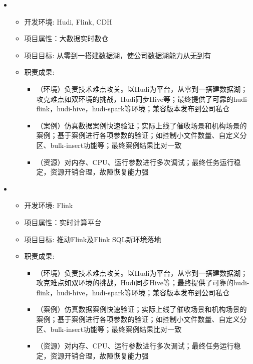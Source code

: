   \begin{itemize}[leftmargin=*]
    \item
      {\small
      \begin{itemize}
        \item 开发环境: Hudi, Flink, CDH
        \item 项目属性：大数据实时数仓
        \item 项目目标: 从零到一搭建数据湖，使公司数据湖能力从无到有
        \item 职责成果: 
        \begin{itemize}
          \item （环境）负责技术难点攻关。以Hudi为平台，从零到一搭建数据湖；攻克难点如双环境的挑战，Hudi同步Hive等；最终提供了可靠的hudi-flink，hudi-hive，hudi-spark等环境；兼容版本发布到公司私仓
          \item （案例）仿真数据案例快速验证；实际上线了催收场景和机构场景的案例；基于案例进行各项参数的验证；如控制小文件数量、自定义分区、bulk-insert功能等；最终案例结果比对一致
          \item （资源）对内存、CPU、运行参数进行多次调试；最终任务运行稳定，资源开销合理，故障恢复能力强
        \end{itemize}
      \end{itemize}
      }
  \end{itemize}

  \begin{itemize}[leftmargin=*]
    \item
      {\small
      \begin{itemize}
        \item 开发环境: Flink
        \item 项目属性：实时计算平台
        \item 项目目标: 推动Flink及Flink SQL新环境落地
        \item 职责成果: 
        \begin{itemize}
          \item （环境）负责技术难点攻关。以Hudi为平台，从零到一搭建数据湖；攻克难点如双环境的挑战，Hudi同步Hive等；最终提供了可靠的hudi-flink，hudi-hive，hudi-spark等环境；兼容版本发布到公司私仓
          \item （案例）仿真数据案例快速验证；实际上线了催收场景和机构场景的案例；基于案例进行各项参数的验证；如控制小文件数量、自定义分区、bulk-insert功能等；最终案例结果比对一致
          \item （资源）对内存、CPU、运行参数进行多次调试；最终任务运行稳定，资源开销合理，故障恢复能力强
        \end{itemize}
      \end{itemize}
      }
  \end{itemize}


